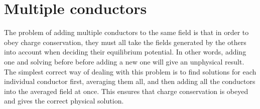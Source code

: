 \documentclass[a4paper,10pt]{article}
\begin{document}
\thispagestyle{empty}
\section*{Multiple conductors}
The problem of adding multiple conductors to the same field is that in order to obey charge conservation, they must all take the fields generated by the others into account when deciding their equilibrium potential. In other words, adding one and solving before before adding a new one will give an unphysical result. The simplest correct way of dealing with this problem is to find solutions for each individual conductor first, averaging them all, and then adding all the conductors into the averaged field at once. This ensures that charge conservation is obeyed and gives the correct physical solution.
\end{document}
